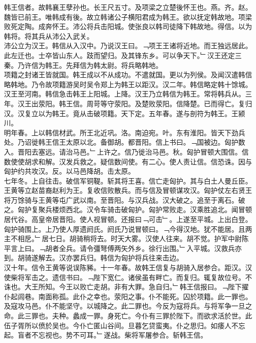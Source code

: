 \documentclass{zhvt-classic}
\begin{document}

\hspace*{2em}韩王信者。故韩襄王孽孙也。长王尺五寸。及项梁之立楚後怀王也。燕。齐。赵。魏皆已前王。唯韩成有後。故立韩诸公子横阳君成为韩王。欲以抚定韩故地。项梁败死定陶。成奔怀王。沛公将兵击阳城。使张良以韩司徒降下韩故地。得信。以为韩将。将其兵从沛公入武关。\\
\hspace*{2em}沛公立为汉王。韩信从入汉中。乃说汉王曰。﹁项王王诸将近地。而王独远居此。此左迁也。士卒皆山东人。跂而望归。及其锋东乡。可以争天下。﹂汉王还定三秦。乃许信为韩王。先拜信为韩太尉。将兵略韩地。\\
\hspace*{2em}项籍之封诸王皆就国。韩王成以不从成功。不遣就国。更以为列侯。及闻汉遣韩信略韩地。乃令故项籍游吴时吴令郑上为韩王以距汉。汉二年。韩信略定韩十馀城。汉王至河南。韩信急击韩王上阳城。上降。汉王乃立韩信为韩王。常将韩兵从。三年。汉王出荥阳。韩王信。周苛等守荥阳。及楚败荥阳。信降楚。已而得亡。复归汉。汉复立以为韩王。竟从击破项籍。天下定。五年春。遂与剖符为韩王。王颍川。\\
\hspace*{2em}明年春。上以韩信材武。所王北近巩。洛。南迫宛。叶。东有淮阳。皆天下劲兵处。乃诏徙韩王信王太原以北。备御胡。都晋阳。信上书曰。﹁国被边。匈护数入。晋阳去塞远。请治马邑。﹂上许之。信乃徙治马邑。秋。匈护冒顿大围信。信数使使胡求和解。汉发兵救之。疑信数间使。有二心。使人责让信。信恐诛。因与匈护约共攻汉。反。以马邑降胡。击太原。\\
\hspace*{2em}七年冬。上自往击。破信军铜鞮。斩其将王喜。信亡走匈护。其与白土人曼丘臣。王黄等立赵苗裔赵利为王。复收信败散兵。而与信及冒顿谋攻汉。匈护仗左右贤王将万馀骑与王黄等屯广武以南。至晋阳。与汉兵战。汉大破之。追至于离石。破之。匈护复聚兵楼烦西北。汉令车骑击破匈护。匈护常败走。汉乘胜追北。闻冒顿居代谷。高皇帝居晋阳。使人视冒顿。还报曰﹁可击﹂。上遂至平城。上出白登。匈护骑围上。上乃使人厚遗阏氏。阏氏乃说冒顿曰。﹁今得汉地。犹不能居。且两主不相戹。﹂居七日。胡骑稍将去。时天大雾。汉使人往来。胡不觉。护军中尉陈平言上曰。﹁胡者全兵。请令彊弩傅两矢外乡。徐行出围。﹂入平城。汉救兵亦到。胡骑遂解去。汉亦罢兵归。韩信为匈护将兵往来击边。\\
\hspace*{2em}汉十年。信令王黄等说误陈豨。十一年春。故韩王信复与胡骑入居参合。距汉。汉使柴将军击之。遗信书曰。﹁陛下宽仁。诸侯虽有畔亡。而复归。辄复故位号。不诛也。大王所知。今王以败亡走胡。非有大罪。急自归。﹂韩王信报曰。﹁陛下擢仆起闾巷。南面称孤。此仆之幸也。荥阳之事。仆不能死。囚於项籍。此一罪也。及寇攻马邑。仆不能坚守。以城降之。此二罪也。今反为寇将兵。与将军争一旦之命。此三罪也。夫种。蠡成一罪。身死亡。今仆有三罪於陛下。而欲求活於世。此伍子胥所以偾於吴也。今仆亡匿山谷间。旦暮乞贷蛮夷。仆之思归。如痿人不忘起。盲者不忘视也。势不可耳。﹂遂战。柴将军屠参合。斩韩王信。\\
\end{document}
